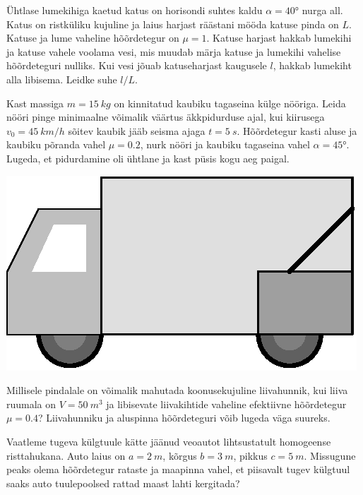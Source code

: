 \documentclass[10pt]{article}
\begin{document}
{%

Ühtlase lumekihiga kaetud katus on horisondi suhtes kaldu $\alpha = \ang{40}$ nurga all. Katus on ristküliku kujuline ja laius harjast räästani mööda katuse pinda on $L$. Katuse ja lume vaheline hõõrdetegur on $\mu = \num{1}$. Katuse harjast hakkab lumekihi ja katuse vahele voolama vesi, mis muudab märja katuse ja lumekihi vahelise hõõrdeteguri nulliks. Kui vesi jõuab katuseharjast kaugusele $l$, hakkab lumekiht alla libisema. Leidke suhe $l/L$.
\probend
\bigskip


Kast massiga $m=\SI{15}{kg}$ on kinnitatud kaubiku tagaseina külge nööriga. Leida nööri pinge minimaalne võimalik väärtus äkkpidurduse ajal, kui kiirusega $v_0=\SI{45}{km/h}$ sõitev kaubik jääb seisma ajaga $t=\SI{5}{s}$. Hõõrdetegur kasti aluse ja kaubiku põranda vahel $\mu=\num{0,2}$, nurk nööri ja kaubiku tagaseina vahel $\alpha=\ang{45}$. Lugeda, et pidurdamine oli ühtlane ja kast püsis kogu aeg paigal.
\begin{center}
	\includegraphics[width=0.5\linewidth]{2009-v3g-02-G_kast_kaubikus.eps}
\end{center}
\probend
\bigskip


Millisele pindalale on võimalik mahutada koonusekujuline liivahunnik, kui liiva ruumala on $V=\SI{50}{m^{3}}$ ja libisevate liivakihtide vaheline efektiivne hõõrdetegur $\mu=\num{0.4}$? Liivahunniku ja aluspinna hõõrdeteguri võib lugeda väga suureks.
\probend
\bigskip


Vaatleme tugeva külgtuule kätte jäänud veoautot lihtsustatult homogeense risttahukana. Auto laius on $a = \SI{2}{m}$, kõrgus $b = \SI{3}{m}$, pikkus
$c = \SI{5}{m}$. Missugune peaks olema hõõrdetegur rataste ja maapinna vahel, et piisavalt tugev külgtuul saaks auto tuulepoolsed rattad maast lahti kergitada?
\probend
\newpage

}
\end{document}
